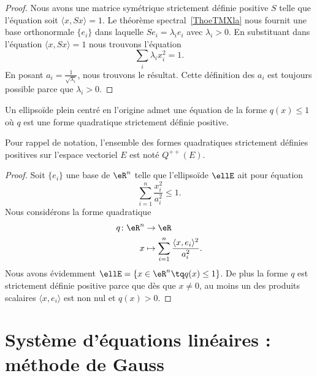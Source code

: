 \begin{proof}
	Nous avons une matrice symétrique strictement définie positive \( S\) telle que l'équation soit \( \langle x, Sx\rangle =1\). Le théorème spectral~\ref{ThoeTMXla} nous fournit une base orthonormale \( \{ e_i \}\) dans laquelle \( Se_i=\lambda_ie_i\) avec \( \lambda_i>0\). En substituant dans l'équation \( \langle x, Sx\rangle =1\) nous trouvons l'équation
	\begin{equation}
		\sum_i\lambda_ix_i^2=1.
	\end{equation}
	En posant \( a_i=\frac{1}{ \sqrt{\lambda_i} }\), nous trouvons le résultat.  Cette définition des \( a_i\) est toujours possible parce que \( \lambda_i>0\).
\end{proof}

\begin{corollary}   \label{CorKGJooOmcBzh}
	Un ellipsoïde plein centré en l'origine admet une équation de la forme \( q(x)\leq 1\) où \( q\) est une forme quadratique strictement définie positive.
\end{corollary}
Pour rappel de notation, l'ensemble des formes quadratiques strictement définies positives sur l'espace vectoriel \( E\) est noté \( Q^{++}(E)\).

\begin{proof}
	Soit \( \{ e_i \}\) une base de \( \eR^n\) telle que l'ellipsoïde \( \ellE\) ait pour équation
	\begin{equation}
		\sum_{i=1}^n\frac{ x_i^2 }{ a_i^2 }\leq 1.
	\end{equation}
	Nous considérons la forme quadratique
	\begin{equation}
		\begin{aligned}
			q\colon \eR^n & \to \eR                                                        \\
			x             & \mapsto \sum_{i=1}^n\frac{ \langle x, e_i\rangle^2 }{ a_i^2 }.
		\end{aligned}
	\end{equation}
	Nous avons évidemment \( \ellE=\{ x\in \eR^n\tq q(x)\leq 1 \}\). De plus la forme \( q\) est strictement définie positive parce que dès que \( x\neq 0\), au moins un des produits scalaires \( \langle x, e_i\rangle \) est non nul et \( q(x)> 0\).
\end{proof}

\section{Système d'équations linéaires : méthode de Gauss}

